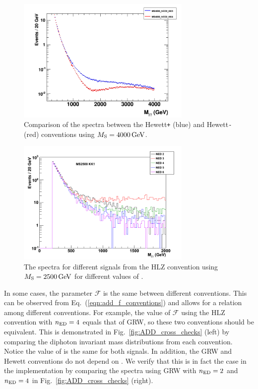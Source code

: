  \begin{figure}[!htbp]
  \centering
  \includegraphics[width=0.75\textwidth]{figures/Hewett_pos_vs_neg}
  \caption{Comparison of the \Mgg spectra between the Hewett\texttt{+} (blue) and Hewett\texttt{-} (red) conventions using $M_{\rm S}=4000\,\text{Ge\hspace{-.08em}V}$.}
  \label{fig:Hewett_pos_neg}
\end{figure}

 \begin{figure}[!htbp]
  \centering
  \includegraphics[width=0.75\textwidth]{figures/DiPhoton_Minv_MS2500_KK1_plot}
  \caption{The \Mgg spectra for different signals from the HLZ convention using $M_{\rm S}=2500\,\text{Ge\hspace{-.08em}V}$ for different values of \nED.}
  \label{fig:HLZ_vary_nED}
\end{figure}

In some cases, the parameter $\mathcal{F}$ is the same between different conventions. This can be observed from Eq.~(\ref{eqn:add_f_conventions}) and allows for a relation among different conventions. For example, the value of $\mathcal{F}$ using the HLZ convention with $n_{\rm ED}=4$ equals that of GRW, so these two conventions should be equivalent. This is demonstrated in Fig.~\ref{fig:ADD_cross_checks} (left) by comparing the diphoton invariant mass distributions from each convention. Notice the value of \etaG is the same for both signals. In addition, the GRW and Hewett conventions do not depend on \nED. We verify that this is in fact the case in the \SHERPA implementation by comparing the \Mgg spectra using GRW with $n_{\rm ED} = 2$ and $n_{\rm ED} = 4$ in Fig.~\ref{fig:ADD_cross_checks} (right).

